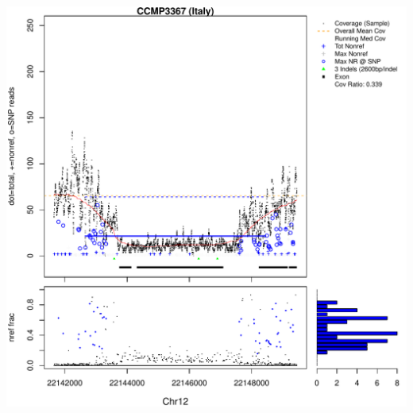 \documentclass{article}\usepackage[]{graphicx}\usepackage[]{color}
\makeatletter
\def\maxwidth{ %
  \ifdim\Gin@nat@width>\linewidth
    \linewidth
  \else
    \Gin@nat@width
  \fi
}
\newenvironment{knitrout}{}{} %
\makeatother
\begin{document}
\begin{knitrout}
{\includegraphics[width=\maxwidth]{figs-knitr/unnamed-chunk-56-7} 

}



\end{knitrout}
\end{document}
